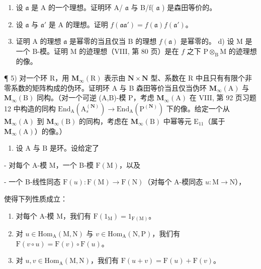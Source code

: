 \begin{enumerate}
\def\labelenumi{\alph{enumi})}
\item
  设 \(\mathfrak{a}\) 是 A 的一个理想。证明环 A/ \(\mathfrak{a}\) 与 B/f( \(\mathfrak{a}\) ) 是森田等价的。
\item
  设 \(\mathfrak{a}\) 与 \(\mathfrak{a}'\) 是 A 的理想。证明 \(f(\mathfrak{aa}') = f(\mathfrak{a})f(\mathfrak{a}')\)。
\item
  证明 A 的理想 \(\mathfrak{a}\) 是幂零的当且仅当 B 的理想 \(f(\mathfrak{a})\) 是幂零的。 d) 设 M 是一个 B-模。证明 M 的迹理想（VIII, 第 80 页）是在 \(f\) 之下 \(\mathrm{P} \otimes_{\mathrm{B}} \mathrm{M}\) 的迹理想的像。
\end{enumerate}

¶ 5) 对一个环 R，用 \(\mathbf{M}_{\infty}(\mathrm{R})\) 表示由 \(\mathbf{N} \times \mathbf{N}\) 型、系数在 R 中且只有有限个非零系数的矩阵构成的伪环。证明环 A 与 B 森田等价当且仅当伪环 \(\mathbf{M}_{\infty}(\mathrm{A})\) 与 \(\mathbf{M}_{\infty}(\mathrm{B})\) 同构。（对一个可逆 (A,B)-模 P，考虑 \(\mathbf{M}_{\infty}(\mathrm{A})\) 在 VIII, 第 92 页习题 12 中构造的同构 \(\mathrm{End}_{\mathrm{A}}(\mathrm{A}_{s}^{(\mathbf{N})}) \to \mathrm{End}_{\mathrm{A}}(\mathrm{P}^{(\mathbf{N})})\) 下的像。给定一个从 \(\mathbf{M}_{\infty}(\mathrm{A})\) 到 \(\mathbf{M}_{\infty}(\mathrm{B})\) 的同构，考虑在 \(\mathbf{M}_{\infty}(\mathrm{B})\) 中幂等元 \(\mathrm{E}_{11}\)（属于 \(\mathbf{M}_{\infty}(\mathrm{A})\)）的像。）

\begin{enumerate}
\def\labelenumi{\arabic{enumi})}
\setcounter{enumi}{5}
\tightlist
\item
  设 \(\mathrm{A}\) 与 \(\mathrm{B}\) 是环。设给定了
\end{enumerate}

- 对每个 A-模 M，一个 B-模 \(\mathrm{F(M)}\)，以及

- 一个 B-线性同态 \(\mathrm{F}(u): \mathrm{F}(\mathrm{M}) \to \mathrm{F}(\mathrm{N})\)（对每个 A-模同态 \(u: \mathrm{M} \to \mathrm{N}\)），

使得下列性质成立：

\begin{enumerate}
\def\labelenumi{(\roman{enumi})}
\item
  对每个 A-模 M，我们有 \(\mathrm{F}(1_{\mathrm{M}}) = 1_{\mathrm{F(M)}}\)。
\item
  对 \(u \in \mathrm{Hom}_{\mathrm{A}}(\mathrm{M}, \mathrm{N})\) 与 \(v \in \mathrm{Hom}_{\mathrm{A}}(\mathrm{N}, \mathrm{P})\)，我们有 \(\mathrm{F}(v \circ u) = \mathrm{F}(v) \circ \mathrm{F}(u)\)。
\item
  对 \(u, v \in \mathrm{Hom}_{\mathrm{A}}(\mathrm{M}, \mathrm{N})\)，我们有 \(\mathrm{F}(u + v) = \mathrm{F}(u) + \mathrm{F}(v)\)。
\end{enumerate}


